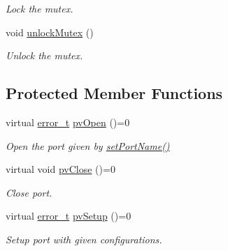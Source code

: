 \begin{DoxyCompactItemize}
\begin{DoxyCompactList}\small\item\em Lock the mutex. \end{DoxyCompactList}\item 
\hypertarget{classmdt_abstract_port_a3523c72a06e4d950338f91e56c286e84}{
void \hyperlink{classmdt_abstract_port_a3523c72a06e4d950338f91e56c286e84}{unlockMutex} ()}
\label{classmdt_abstract_port_a3523c72a06e4d950338f91e56c286e84}

\begin{DoxyCompactList}\small\item\em Unlock the mutex. \end{DoxyCompactList}\end{DoxyCompactItemize}
\subsection*{Protected Member Functions}
\begin{DoxyCompactItemize}
\item 
virtual \hyperlink{classmdt_abstract_port_ad4121bb930c95887e77f8bafa065a85e}{error\_\-t} \hyperlink{classmdt_abstract_port_ac1440ea9759cbbee9efc5ea22afcdb0a}{pvOpen} ()=0
\begin{DoxyCompactList}\small\item\em Open the port given by \hyperlink{classmdt_abstract_port_a0ca143d32fc677bac7c1cf0e04144932}{setPortName()} \end{DoxyCompactList}\item 
virtual void \hyperlink{classmdt_abstract_port_add29e91ccc4be62ab5c0dcb2a68ae8f0}{pvClose} ()=0
\begin{DoxyCompactList}\small\item\em Close port. \end{DoxyCompactList}\item 
virtual \hyperlink{classmdt_abstract_port_ad4121bb930c95887e77f8bafa065a85e}{error\_\-t} \hyperlink{classmdt_abstract_port_a880e5ae1699af102f9a80501bb6a0021}{pvSetup} ()=0
\begin{DoxyCompactList}\small\item\em Setup port with given configurations. \end{DoxyCompactList}\end{DoxyCompactItemize}
